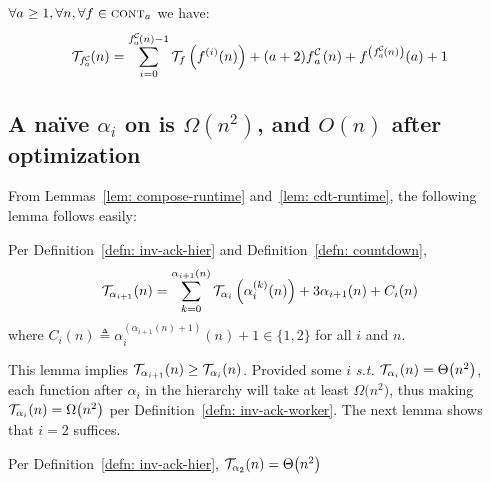 \begin{lem} \label{lem: cdt-runtime}
	$\forall a\ge 1, \forall n, \forall f\in \text{\scshape{cont}}_{a}$ we have:
	\begin{equation*}
	\runtime_{\cdt{f}{a}}(n) =
	\sum_{i=0}^{\cdt{f}{a}(n) - 1} \runtime_f\left(f^{(i)}(n)\right)
	+ (a + 2)\cdt{f}{a}(n) + f^{\left(\cdt{f}{a}(n)\right)}(a) + 1
	\end{equation*}
\end{lem}

\subsection{A na\"ive $\alpha_i$ on  is $\Omega(n^2)$, and $O(n)$ after optimization} \label{sect: hardcode-lvl2}

\noindent From Lemmas~\ref{lem: compose-runtime} and~\ref{lem: cdt-runtime}, the following lemma follows easily:
\begin{lem} \label{lem: inv-ack-hier-runtime}
	Per Definition~\ref{defn: inv-ack-hier} and Definition~\ref{defn: countdown},
	\begin{equation*}
	\mathcal{T}_{\alpha_{i+1}}(n) = \sum_{k=0}^{\alpha_{i+1}(n)}\mathcal{T}_{\alpha_i}\left( \alpha_i^{(k)}(n)\right) + 3\alpha_{i+1}(n) + C_i(n)
	\end{equation*}
	where $C_i(n) \triangleq \alpha_i^{(\alpha_{i+1}(n) + 1)}(n) + 1 \in \{1, 2\}$ for all $i$ and $n$.
\end{lem}
This lemma implies $\mathcal{T}_{\alpha_{i+1}}(n) \ge \mathcal{T}_{\alpha_i}(n)$. Provided some $i$ \emph{s.t.} $\mathcal{T}_{\alpha_i}(n) = \Theta\big(n^2\big)$, each function after $\alpha_i$ in the hierarchy will take at least $\Omega\big(n^2\big)$, thus making $\mathcal{T}_{\alpha_i} (n) = \Omega\big(n^2\big)$ per Definition~\ref{defn: inv-ack-worker}. The next lemma shows that $i = 2$ suffices.
\begin{lem} \label{lem:runtimealpha2}
	Per Definition~\ref{defn: inv-ack-hier}, $\mathcal{T}_{\alpha_2}(n) = \Theta\big(n^2\big)$
\end{lem}


